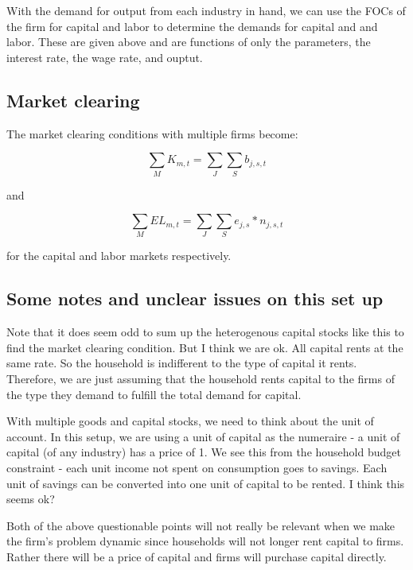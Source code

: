 \documentclass[letterpaper,12pt]{article}
\theoremstyle{definition}
\begin{document}
With the demand for output from each industry in hand, we can use the FOCs of the firm for capital and labor to determine the demands for capital and and labor.  These are given above and are functions of only the parameters, the interest rate, the wage rate, and ouptut.

\subsection*{Market clearing}

The market clearing conditions with multiple firms become:

\begin{equation}
\sum_{M} K_{m,t} = \sum_{J}\sum_{S}b_{j,s,t}
\end{equation}

\noindent\noindent and 

\begin{equation}
\sum_{M} EL_{m,t} = \sum_{J}\sum_{S}e_{j,s}*n_{j,s,t}
\end{equation}

\noindent\noindent for the capital and labor markets respectively.


\subsection*{Some notes and unclear issues on this set up}
Note that it does seem odd to sum up the heterogenous capital stocks like this to find the market clearing condition.  But I think we are ok.  All capital rents at the same rate.  So the household is indifferent to the type of capital it rents. Therefore, we are just assuming that the household rents capital to the firms of the type they demand to fulfill the total demand for capital. 

With multiple goods and capital stocks, we need to think about the unit of account.  In this setup, we are using a unit of capital as the numeraire - a unit of capital (of any industry) has a price of 1.  We see this from the household budget constraint - each unit income not spent on consumption goes to savings.  Each unit of savings can be converted into one unit of capital to be rented.  I think this seems ok?

Both of the above questionable points will not really be relevant when we make the firm's problem dynamic since households will not longer rent capital to firms.  Rather there will be a price of capital and firms will purchase capital directly.
\end{document}
